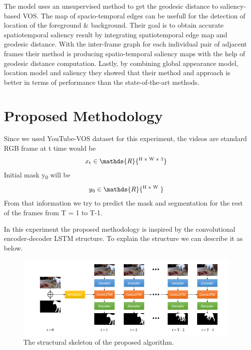 \documentclass[conference]{IEEEtran}
\begin{document}
The model uses an unsupervised method to get the geodesic distance to saliency-based VOS. The map of spacio-temporal edges can be usefull for the detection of location of the foreground & background. Their goal is to obtain accurate spatiotemporal saliency result by integrating spatiotemporal edge map and geodesic distance. With the inter-frame graph for each individual pair of adjacent frames their method is producing spatio-temporal saliency maps with the help of geodesic distance computation. Lastly, by combining global appearance model, location model and saliency they showed that their method and approach is better in terms of performance than the state-of-the-art methods.


\vspace*{.5cm}
\section{Proposed Methodology}
Since we used YouTube-VOS dataset for this experiment, the videos are standard RGB frame at t time would be \[ x\textsubscript{t} \in  \mathds{R} {\textsuperscript{H x W x 3}}\]
Initial mask y\textsubscript{0} will be \[ y\textsubscript{0} \in  \mathds{R} {\textsuperscript{H x W }}\]
From that information we try to predict the mask and segmentation for the rest of the frames from T = 1 to T-1. 

In this experiment the proposed methodology is inspired by the convolutional encoder-decoder LSTM structure. To explain the structure we can describe it as below.

\begin{figure}[h!]
\centering
\includegraphics[scale=.6]{structure}
\caption{The structural skeleton of the proposed algorithm.}
\label{fig:structure}
\end{figure}
\end{document}
